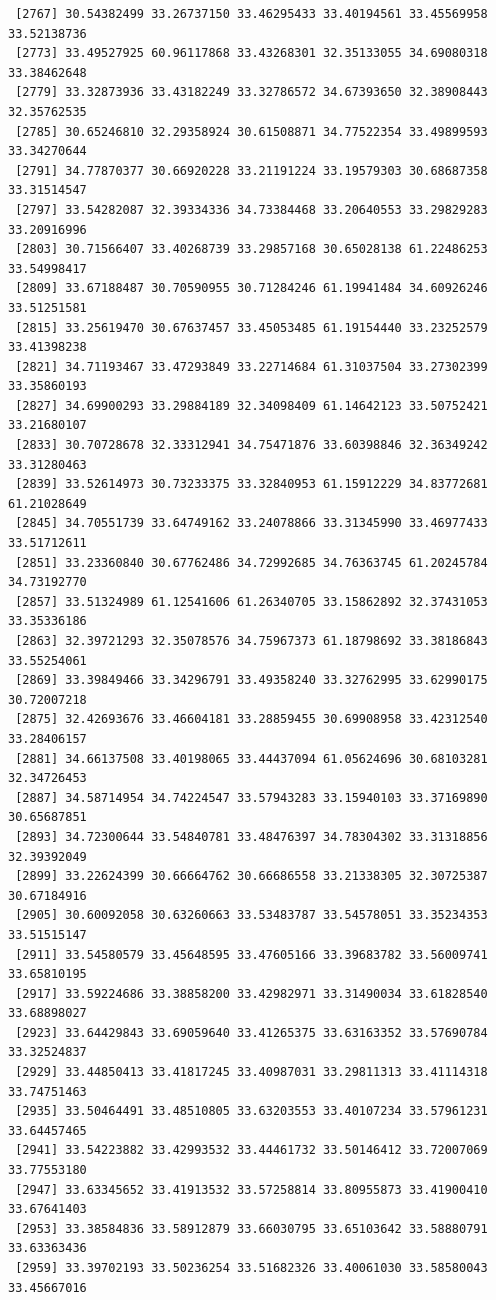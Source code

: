 \documentclass[
  letterpaper,
  DIV=11,
  numbers=noendperiod]{scrartcl}
\begin{document}
\begin{verbatim}
 [2767] 30.54382499 33.26737150 33.46295433 33.40194561 33.45569958 33.52138736
 [2773] 33.49527925 60.96117868 33.43268301 32.35133055 34.69080318 33.38462648
 [2779] 33.32873936 33.43182249 33.32786572 34.67393650 32.38908443 32.35762535
 [2785] 30.65246810 32.29358924 30.61508871 34.77522354 33.49899593 33.34270644
 [2791] 34.77870377 30.66920228 33.21191224 33.19579303 30.68687358 33.31514547
 [2797] 33.54282087 32.39334336 34.73384468 33.20640553 33.29829283 33.20916996
 [2803] 30.71566407 33.40268739 33.29857168 30.65028138 61.22486253 33.54998417
 [2809] 33.67188487 30.70590955 30.71284246 61.19941484 34.60926246 33.51251581
 [2815] 33.25619470 30.67637457 33.45053485 61.19154440 33.23252579 33.41398238
 [2821] 34.71193467 33.47293849 33.22714684 61.31037504 33.27302399 33.35860193
 [2827] 34.69900293 33.29884189 32.34098409 61.14642123 33.50752421 33.21680107
 [2833] 30.70728678 32.33312941 34.75471876 33.60398846 32.36349242 33.31280463
 [2839] 33.52614973 30.73233375 33.32840953 61.15912229 34.83772681 61.21028649
 [2845] 34.70551739 33.64749162 33.24078866 33.31345990 33.46977433 33.51712611
 [2851] 33.23360840 30.67762486 34.72992685 34.76363745 61.20245784 34.73192770
 [2857] 33.51324989 61.12541606 61.26340705 33.15862892 32.37431053 33.35336186
 [2863] 32.39721293 32.35078576 34.75967373 61.18798692 33.38186843 33.55254061
 [2869] 33.39849466 33.34296791 33.49358240 33.32762995 33.62990175 30.72007218
 [2875] 32.42693676 33.46604181 33.28859455 30.69908958 33.42312540 33.28406157
 [2881] 34.66137508 33.40198065 33.44437094 61.05624696 30.68103281 32.34726453
 [2887] 34.58714954 34.74224547 33.57943283 33.15940103 33.37169890 30.65687851
 [2893] 34.72300644 33.54840781 33.48476397 34.78304302 33.31318856 32.39392049
 [2899] 33.22624399 30.66664762 30.66686558 33.21338305 32.30725387 30.67184916
 [2905] 30.60092058 30.63260663 33.53483787 33.54578051 33.35234353 33.51515147
 [2911] 33.54580579 33.45648595 33.47605166 33.39683782 33.56009741 33.65810195
 [2917] 33.59224686 33.38858200 33.42982971 33.31490034 33.61828540 33.68898027
 [2923] 33.64429843 33.69059640 33.41265375 33.63163352 33.57690784 33.32524837
 [2929] 33.44850413 33.41817245 33.40987031 33.29811313 33.41114318 33.74751463
 [2935] 33.50464491 33.48510805 33.63203553 33.40107234 33.57961231 33.64457465
 [2941] 33.54223882 33.42993532 33.44461732 33.50146412 33.72007069 33.77553180
 [2947] 33.63345652 33.41913532 33.57258814 33.80955873 33.41900410 33.67641403
 [2953] 33.38584836 33.58912879 33.66030795 33.65103642 33.58880791 33.63363436
 [2959] 33.39702193 33.50236254 33.51682326 33.40061030 33.58580043 33.45667016

\end{verbatim}
\end{document}
